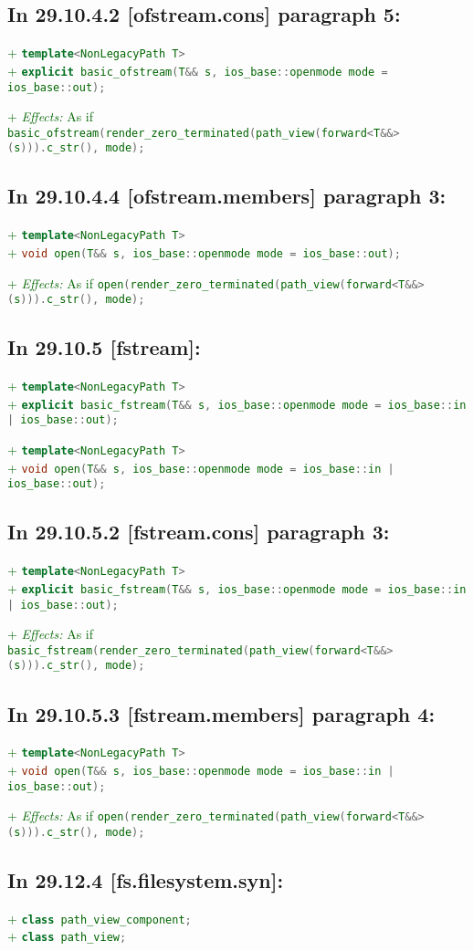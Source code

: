 \documentclass[11pt]{article}
\newcommand{\code}[2][cpp]{\lstinline[language=#1,basicstyle=\small\ttfamily]{#2}}
\newcommand{\desc}[1]{\textit{#1}}
\newcommand{\effects}{\desc{Effects: }}
\newcommand{\tsrefp}[3]{\subsection*{In #2 \textbf{[#1]} paragraph #3:}}
\newcommand{\tsref}[2]{\subsection*{In #2 \textbf{[#1]}:}}
\newcommand{\tsreplace}[3]{\textcolor{red}{\sout{#1}}#2\textcolor{darkgreen}{#3}}
\begin{document}
\tsrefp{ofstream.cons}{29.10.4.2}{5}

\tsreplace{}{}{+ \code{template<NonLegacyPath T>}}\\
\tsreplace{}{}{+ \code{explicit basic_ofstream(T&& s,
ios_base::openmode mode = ios_base::out);}}

\tsreplace{}{}{+ \effects As if \code{basic_ofstream(render_zero_terminated(path_view(forward<T&&>(s))).c_str(), mode);}}

\tsrefp{ofstream.members}{29.10.4.4}{3}

\tsreplace{}{}{+ \code{template<NonLegacyPath T>}}\\
\tsreplace{}{}{+ \code{void open(T&& s, ios_base::openmode mode = ios_base::out);}}

\tsreplace{}{}{+ \effects As if \code{open(render_zero_terminated(path_view(forward<T&&>(s))).c_str(), mode);}}


\tsref{fstream}{29.10.5}

\tsreplace{}{}{+ \code{template<NonLegacyPath T>}}\\
\tsreplace{}{}{+ \code{explicit basic_fstream(T&& s, ios_base::openmode mode = ios_base::in | ios_base::out);}}

\tsreplace{}{}{+ \code{template<NonLegacyPath T>}}\\
\tsreplace{}{}{+ \code{void open(T&& s, ios_base::openmode mode = ios_base::in | ios_base::out);}}


\tsrefp{fstream.cons}{29.10.5.2}{3}

\tsreplace{}{}{+ \code{template<NonLegacyPath T>}}\\
\tsreplace{}{}{+ \code{explicit basic_fstream(T&& s, ios_base::openmode mode = ios_base::in | ios_base::out);}}

\tsreplace{}{}{+ \effects As if \code{basic_fstream(render_zero_terminated(path_view(forward<T&&>(s))).c_str(), mode);}}


\tsrefp{fstream.members}{29.10.5.3}{4}

\tsreplace{}{}{+ \code{template<NonLegacyPath T>}}\\
\tsreplace{}{}{+ \code{void open(T&& s, ios_base::openmode mode = ios_base::in | ios_base::out);}}

\tsreplace{}{}{+ \effects As if \code{open(render_zero_terminated(path_view(forward<T&&>(s))).c_str(), mode);}}


\tsref{fs.filesystem.syn}{29.12.4}

\tsreplace{}{}{+ \code{class path_view_component;}}\\
\tsreplace{}{}{+ \code{class path_view;}}
\end{document}
